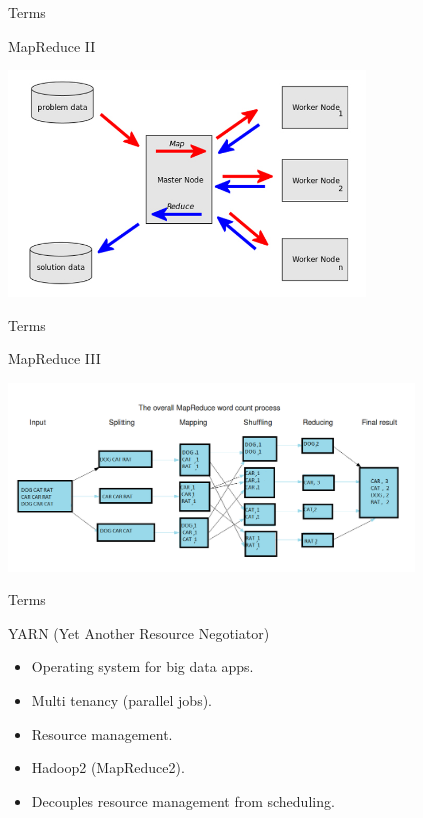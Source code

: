 \begin{frame}{Terms}
  \begin{block}{MapReduce II}
    \begin{center}
      \includegraphics[height=6cm]{img/map-reduce-1.jpg}
    \end{center}
  \end{block}
\end{frame}

\begin{frame}{Terms}
  \begin{block}{MapReduce III}
    \begin{center}
      \includegraphics[height=5cm]{img/map-reduce-2.png}
    \end{center}
  \end{block}
\end{frame}

\begin{frame}{Terms}
  \begin{block}{YARN (Yet Another Resource Negotiator)}
    \begin{itemize}
      \item Operating system for big data apps.
      \item Multi tenancy (parallel jobs).
      \item Resource management.
      \item Hadoop2 (MapReduce2).
      \item Decouples resource management from scheduling.
    \end{itemize}
  \end{block}
\end{frame}

